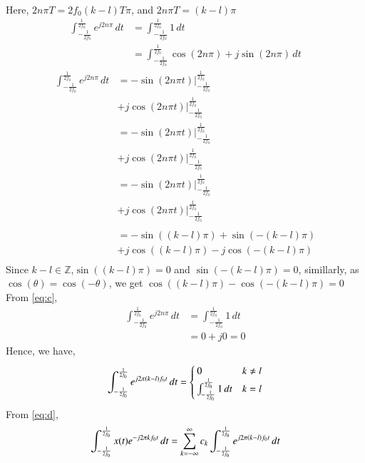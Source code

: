 \documentclass[journal,12pt,twocolumn]{IEEEtran}
\renewcommand\thesection{\arabic{section}}
\begin{document}
\begin{enumerate}[label=\thesection.\arabic*,ref=\thesection.\theenumi]
\begin{align}
		\end{align}
		Here, $2n\pi T=2f_0(k-l)T\pi$, and $2n\pi T=(k-l)\pi$
		\begin{align}
			\int_{-\frac{1}{2f_0}}^{\frac{1}{2f_0}}e^{j2n\pi}\,dt&=\int_{-\frac{1}{2f_0}}^{\frac{1}{2f_0}}1\,dt\\&=\int_{-\frac{1}{2f_0}}^{\frac{1}{2f_0}}\cos(2n\pi)+j\sin(2n\pi) \,dt
		\end{align}
		\begin{align}
			\int_{-\frac{1}{2f_0}}^{\frac{1}{2f_0}}e^{j2n\pi}\,dt&=
			-\sin(2n\pi t)\bigg|_{-\frac{1}{2f_0}}^{\frac{1}{2f_0}}\\&+j\cos(2n\pi t)\bigg|_{-\frac{1}{2f_0}}^{\frac{1}{2f_0}}\\
			&=-\sin(2n\pi t)\bigg|_{-\frac{1}{2f_0}}^{\frac{1}{2f_0}}\\&+j\cos(2n\pi t)\bigg|_{-\frac{1}{2f_0}}^{\frac{1}{2f_0}}\\
			&=-\sin(2n\pi t)\bigg|_{-\frac{1}{2f_0}}^{\frac{1}{2f_0}}\\&+j\cos(2n\pi t)\bigg|_{-\frac{1}{2f_0}}^{\frac{1}{2f_0}}\\
			\label{eq:c}\\
			&=-\sin((k-l)\pi)+\sin(-(k-l)\pi)\\&+j\cos((k-l)\pi)-j\cos(-(k-l)\pi)\\
		\end{align}
		Since $k-l \in \mathbb{Z}$,$\sin((k-l)\pi)=0$ and $\sin(-(k-l)\pi)=0$, simillarly, as $\cos(\theta)=\cos(-\theta)$, we get $\cos((k-l)\pi)-\cos(-(k-l)\pi)=0$\\
		From \eqref{eq:c},
		\begin{align}
			\int_{-\frac{1}{2f_0}}^{\frac{1}{2f_0}}e^{j2n\pi}\,dt&=\int_{-\frac{1}{2f_0}}^{\frac{1}{2f_0}}1\,dt\\&=0+j0=0
		\end{align}
		Hence, we have,
		\begin{align}
			\int_{-\frac{1}{2f_0}}^{\frac{1}{2f_0}}e^{j2\pi \left(k-l\right)f_0 t}\,dt=
			\begin{cases}
				0 & k\neq l
				\\
				\int_{-\frac{1}{2f_0}}^{\frac{1}{2f_0}}1\,dt& k=l
			\end{cases}
		\end{align}
		From \eqref{eq:d},
		\begin{align}
			\int_{-\frac{1}{2f_0}}^{\frac{1}{2f_0}}x(t)e^{-j2\pi kf_0 t}\, dt&=\sum_{k = -\infty}^{\infty}c_k\int_{-\frac{1}{2f_0}}^{\frac{1}{2f_0}}e^{j2\pi \brak{k-l}f_0 t}\,dt\\

\end{align}
\end{enumerate}
\end{document}
